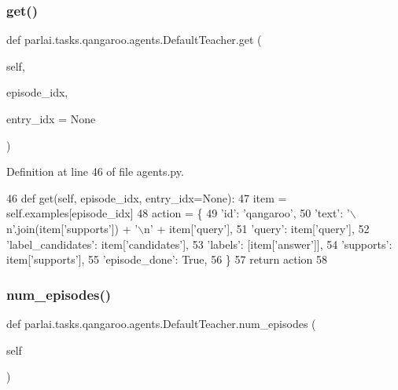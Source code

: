 \subsubsection{\texorpdfstring{get()}{get()}}
{\footnotesize\ttfamily def parlai.\+tasks.\+qangaroo.\+agents.\+Default\+Teacher.\+get (\begin{DoxyParamCaption}\item[{}]{self,  }\item[{}]{episode\+\_\+idx,  }\item[{}]{entry\+\_\+idx = {\ttfamily None} }\end{DoxyParamCaption})}



Definition at line 46 of file agents.\+py.


\begin{DoxyCode}
46     \textcolor{keyword}{def }get(self, episode\_idx, entry\_idx=None):
47         item = self.examples[episode\_idx]
48         action = \{
49             \textcolor{stringliteral}{'id'}: \textcolor{stringliteral}{'qangaroo'},
50             \textcolor{stringliteral}{'text'}: \textcolor{stringliteral}{'\(\backslash\)n'}.join(item[\textcolor{stringliteral}{'supports'}]) + \textcolor{stringliteral}{'\(\backslash\)n'} + item[\textcolor{stringliteral}{'query'}],
51             \textcolor{stringliteral}{'query'}: item[\textcolor{stringliteral}{'query'}],
52             \textcolor{stringliteral}{'label\_candidates'}: item[\textcolor{stringliteral}{'candidates'}],
53             \textcolor{stringliteral}{'labels'}: [item[\textcolor{stringliteral}{'answer'}]],
54             \textcolor{stringliteral}{'supports'}: item[\textcolor{stringliteral}{'supports'}],
55             \textcolor{stringliteral}{'episode\_done'}: \textcolor{keyword}{True},
56         \}
57         \textcolor{keywordflow}{return} action
58 
\end{DoxyCode}
\mbox{\label{classparlai_1_1tasks_1_1qangaroo_1_1agents_1_1DefaultTeacher_a467ada61caf807815a88abfd6e742799}} 
\subsubsection{\texorpdfstring{num\+\_\+episodes()}{num\_episodes()}}
{\footnotesize\ttfamily def parlai.\+tasks.\+qangaroo.\+agents.\+Default\+Teacher.\+num\+\_\+episodes (\begin{DoxyParamCaption}\item[{}]{self }\end{DoxyParamCaption})}



